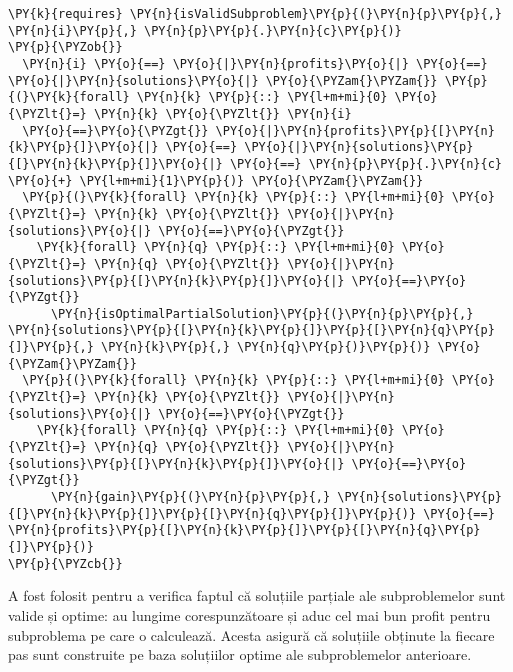 \begin{sloppypar}
\begin{enumerate}
\begin{Verbatim}[commandchars=\\\{\}]
  \PY{k}{requires} \PY{n}{isValidSubproblem}\PY{p}{(}\PY{n}{p}\PY{p}{,} \PY{n}{i}\PY{p}{,} \PY{n}{p}\PY{p}{.}\PY{n}{c}\PY{p}{)}
\PY{p}{\PYZob{}} 
  \PY{n}{i} \PY{o}{==} \PY{o}{|}\PY{n}{profits}\PY{o}{|} \PY{o}{==} \PY{o}{|}\PY{n}{solutions}\PY{o}{|} \PY{o}{\PYZam{}\PYZam{}} \PY{p}{(}\PY{k}{forall} \PY{n}{k} \PY{p}{::} \PY{l+m+mi}{0} \PY{o}{\PYZlt{}=} \PY{n}{k} \PY{o}{\PYZlt{}} \PY{n}{i} 
  \PY{o}{==}\PY{o}{\PYZgt{}} \PY{o}{|}\PY{n}{profits}\PY{p}{[}\PY{n}{k}\PY{p}{]}\PY{o}{|} \PY{o}{==} \PY{o}{|}\PY{n}{solutions}\PY{p}{[}\PY{n}{k}\PY{p}{]}\PY{o}{|} \PY{o}{==} \PY{n}{p}\PY{p}{.}\PY{n}{c} \PY{o}{+} \PY{l+m+mi}{1}\PY{p}{)} \PY{o}{\PYZam{}\PYZam{}} 
  \PY{p}{(}\PY{k}{forall} \PY{n}{k} \PY{p}{::} \PY{l+m+mi}{0} \PY{o}{\PYZlt{}=} \PY{n}{k} \PY{o}{\PYZlt{}} \PY{o}{|}\PY{n}{solutions}\PY{o}{|} \PY{o}{==}\PY{o}{\PYZgt{}} 
    \PY{k}{forall} \PY{n}{q} \PY{p}{::} \PY{l+m+mi}{0} \PY{o}{\PYZlt{}=} \PY{n}{q} \PY{o}{\PYZlt{}} \PY{o}{|}\PY{n}{solutions}\PY{p}{[}\PY{n}{k}\PY{p}{]}\PY{o}{|} \PY{o}{==}\PY{o}{\PYZgt{}} 
      \PY{n}{isOptimalPartialSolution}\PY{p}{(}\PY{n}{p}\PY{p}{,} \PY{n}{solutions}\PY{p}{[}\PY{n}{k}\PY{p}{]}\PY{p}{[}\PY{n}{q}\PY{p}{]}\PY{p}{,} \PY{n}{k}\PY{p}{,} \PY{n}{q}\PY{p}{)}\PY{p}{)} \PY{o}{\PYZam{}\PYZam{}} 
  \PY{p}{(}\PY{k}{forall} \PY{n}{k} \PY{p}{::} \PY{l+m+mi}{0} \PY{o}{\PYZlt{}=} \PY{n}{k} \PY{o}{\PYZlt{}} \PY{o}{|}\PY{n}{solutions}\PY{o}{|} \PY{o}{==}\PY{o}{\PYZgt{}} 
    \PY{k}{forall} \PY{n}{q} \PY{p}{::} \PY{l+m+mi}{0} \PY{o}{\PYZlt{}=} \PY{n}{q} \PY{o}{\PYZlt{}} \PY{o}{|}\PY{n}{solutions}\PY{p}{[}\PY{n}{k}\PY{p}{]}\PY{o}{|} \PY{o}{==}\PY{o}{\PYZgt{}} 
      \PY{n}{gain}\PY{p}{(}\PY{n}{p}\PY{p}{,} \PY{n}{solutions}\PY{p}{[}\PY{n}{k}\PY{p}{]}\PY{p}{[}\PY{n}{q}\PY{p}{]}\PY{p}{)} \PY{o}{==} \PY{n}{profits}\PY{p}{[}\PY{n}{k}\PY{p}{]}\PY{p}{[}\PY{n}{q}\PY{p}{]}\PY{p}{)}
\PY{p}{\PYZcb{}}
\end{Verbatim}
    A fost folosit pentru a verifica faptul că soluțiile parțiale ale subproblemelor sunt valide și optime: au lungime corespunzătoare și aduc cel mai bun profit pentru subproblema pe care o calculează. Acesta asigură că soluțiile obținute la fiecare pas sunt construite pe baza soluțiilor optime ale subproblemelor anterioare.
\end{enumerate}


\end{sloppypar}
